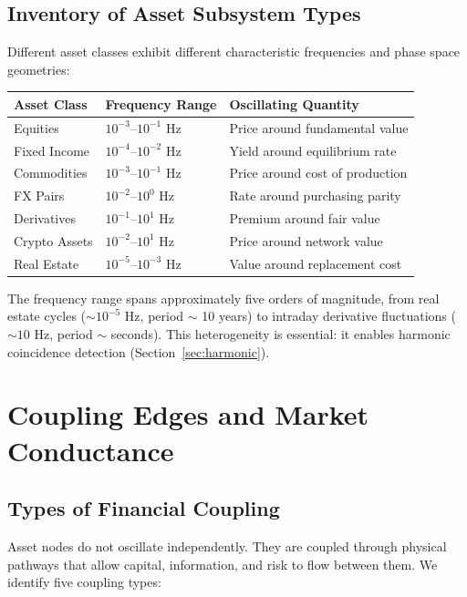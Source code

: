\documentclass[twocolumn,10pt]{article}
\theoremstyle{remark}
\newcommand{\secref}[1]{Section~\ref{#1}}
\begin{document}
\subsection{Inventory of Asset Subsystem Types}

Different asset classes exhibit different characteristic frequencies and phase space geometries:

\begin{center}
\begin{tabular}{lll}
\toprule
\textbf{Asset Class} & \textbf{Frequency Range} & \textbf{Oscillating Quantity} \\
\midrule
Equities & $10^{-3}$--$10^{-1}$ Hz & Price around fundamental value \\
Fixed Income & $10^{-4}$--$10^{-2}$ Hz & Yield around equilibrium rate \\
Commodities & $10^{-3}$--$10^{-1}$ Hz & Price around cost of production \\
FX Pairs & $10^{-2}$--$10^{0}$ Hz & Rate around purchasing parity \\
Derivatives & $10^{-1}$--$10^{1}$ Hz & Premium around fair value \\
Crypto Assets & $10^{-2}$--$10^{1}$ Hz & Price around network value \\
Real Estate & $10^{-5}$--$10^{-3}$ Hz & Value around replacement cost \\
\bottomrule
\end{tabular}
\end{center}

The frequency range spans approximately five orders of magnitude, from real estate cycles ($\sim 10^{-5}$ Hz, period $\sim$ 10 years) to intraday derivative fluctuations ($\sim 10$ Hz, period $\sim$ seconds).  This heterogeneity is essential: it enables harmonic coincidence detection (\secref{sec:harmonic}).


\section{Coupling Edges and Market Conductance}
\label{sec:coupling}

\subsection{Types of Financial Coupling}

Asset nodes do not oscillate independently.  They are coupled through physical pathways that allow capital, information, and risk to flow between them.  We identify five coupling types:
\end{document}
